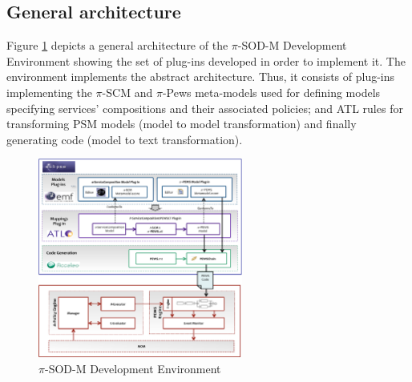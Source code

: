 \subsection{General architecture}

Figure \ref{fig:policymanager} depicts a general architecture of the $\pi$-SOD-M Development Environment showing the set of plug-ins  developed in order to implement it. The environment implements the abstract architecture. Thus, it consists of plug-ins implementing the $\pi$-SCM and $\pi$-{\sc Pews} meta-models used for defining models specifying services' compositions and their associated policies; and ATL rules for transforming  PSM models (model to model transformation) and finally generating code (model to text transformation).
\begin{figure}[t]
	\begin{center}
		\includegraphics[width=0.60\textwidth]{figs/architecture}
	\end{center}
		\caption{$\pi$-SOD-M Development Environment}
   \label{fig:policymanager}
\end{figure}
